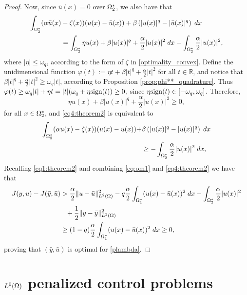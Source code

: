 \begin{proof}
Now, since $\bar{u}(x)=0$ over $\Omega_{2}^*$, we also have that
\begin{equation}\label{eq4:theorem2}
\begin{split}   
\int_{\Omega_2^*}(\alpha\bar{u}(x)&-\zeta(x))(u(x)-\bar{u}(x))+\beta\left(|u(x)|^q-|\bar{u}(x)|^q\right)\; dx\\
&=\int_{\Omega_2^*}\eta u(x)+\beta |u(x)|^q+\frac{\alpha}{2}|u(x)|^2\; dx-\int_{\Omega_2^*}\frac{\alpha}{2}|u(x)|^2,
    \end{split}
\end{equation}
where $|\eta|\le \omega_q$, according to the form of $\zeta$ in 
\eqref{optimality_convex}. Define the unidimensional function 
$\varphi(t):=\eta t+\beta|t|^q+\frac{\alpha}{2}|t|^2$ for all $t\in \mathbb{R}$, and
notice that $\beta|t|^q+\frac{\alpha}{2}|t|^2\ge \omega_q |t|$, according to 
Proposition \ref{prop:phi**_quadrature}. Thus $ \varphi(t)\ge \omega_q|t|+\eta t=|t|(\omega_q+\eta\mathrm{sign}(t))\ge 0$,
since $\eta\mathrm{sign}(t)\in [-\omega_q,\omega_q]$. Therefore, 
\[
\eta u(x)+\beta |u(x)|^q+\frac{\alpha}{2}|u(x)|^2\ge 0,
\]
for all $x\in \Omega_2^*$, and \eqref{eq4:theorem2} is equivalent to
\begin{equation}\label{eq5:theorem2}
\begin{split}   
\int_{\Omega_2^*}(\alpha\bar{u}(x)-\zeta(x))(u(x)-\bar{u}(x))+&\beta\left(|u(x)|^q-|\bar{u}(x)|^q\right)\; dx\\
&\ge-\int_{\Omega_2^*}\frac{\alpha}{2}|u(x)|^2\; dx,
    \end{split}
\end{equation}
Recalling \eqref{eq1:theorem2} and combining \eqref{eq:om1} and \eqref{eq4:theorem2} we have that
\begin{align*}
    J(y,u)-J(\bar{y},\bar{u})&>\frac{\alpha}{2}\lVert u-\bar{u} \rVert_{L^2(\Omega)}^2-q\frac{\alpha}{2}\int_{\Omega_1^*}(u(x)-\bar{u}(x))^2\; dx -\int_{\Omega_2^*}\frac{\alpha}{2}|u(x)|^2\\
    &\phantom{>}+\frac{1}{2}\lVert y-\bar{y} \rVert_{L^2(\Omega)}^2\\    
    &\ge (1-q)\frac{\alpha}{2}\int_{\Omega_1^*}(u(x)-\bar{u}(x))^2\; dx\ge 0,
\end{align*}
proving that $(\bar{y},\bar{u})$ is optimal for \eqref{plambda}.
\end{proof}

\section{$L^0(\Omega)$ penalized control problems}

